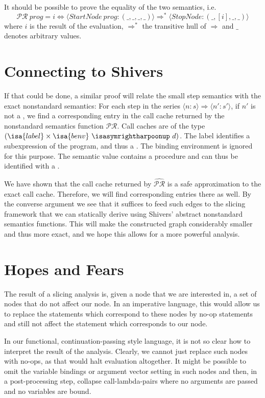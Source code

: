 \documentclass[a4paper,halfparskip,DIV=10,11pt]{scrbook}
\newcommand{\PR}{\mathcal {PR}}
\newcommand{\aPR}{\widehat{\mathcal {PR}}}
\begin{document}
It should be possible to prove the equality of the two semantics, i.e.
\[
\PR\ prog = i
\iff
\langle StartNode\ prog : (\_,\_,\_,\_)\rangle \Rightarrow^* \langle StopNode : (\_,[i],\_,\_)\rangle
\]
where $i$ is the result of the evaluation, $\Rightarrow^*$ the transitive hull of $\Rightarrow$ and $\_$ denotes arbitrary values.

\section{Connecting to Shivers}

If that could be done, a similar proof will relate the small step semantics with the exact nonstandard semantics: For each step in the series $\langle n:s\rangle \Rightarrow \langle n':s'\rangle$, if $n'$ is not a , we find a corresponding entry in the call cache returned by the nonstandard semantics function $\PR$. Call caches are of the type $(\isa{label}\times\isa{benv}\ \isasymrightharpoonup\ d)$. The label identifies a subexpression of the program, and thus a . The binding environment is ignored for this purpose. The semantic value  contains a procedure and can thus be identified with a .

We have shown that the call cache returned by $\aPR$ is a safe approximation to the exact call cache. Therefore, we will find corresponding entries there as well. By the converse argument we see that it suffices to feed such edges to the slicing framework that we can statically derive using Shivers’ abstract nonstandard semantics functions. This will make the constructed graph considerably smaller and thus more exact, and we hope this allows for a more powerful analysis.

\section{Hopes and Fears}

The result of a slicing analysis is, given a node that we are interested in, a set of nodes that do not affect our node. In an imperative language, this would allow us to replace the statements which correspond to these nodes by no-op statements and still not affect the statement which corresponds to our node.

In our functional, continuation-passing style language, it is not so clear how to interpret the result of the analysis. Clearly, we cannot just replace such nodes with no-ops, as that would halt evaluation altogether. It might be possible to omit the variable bindings or argument vector setting in such nodes and then, in a post-processing step, collapse call-lambda-pairs where no arguments are passed and no variables are bound.
\end{document}
